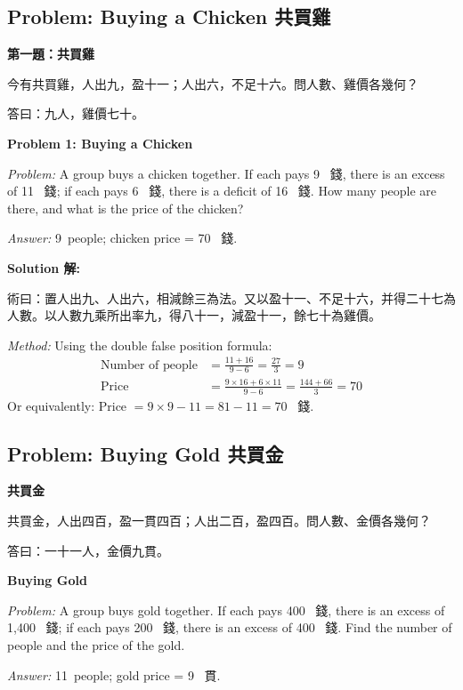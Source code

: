 \documentclass[11pt,a4paper]{article}
\newcommand{\zh}[1]{{\CJKfamily{\CJKrmdefault} #1}}
\newenvironment{chside}{%
  \begin{minipage}[t]{0.48\textwidth}%
  \setlength{\parindent}{1.5em}%
  \linespread{1.25}\selectfont%
  \small%
}{%
  \end{minipage}%
}
\newenvironment{enside}{%
  \hfill\begin{minipage}[t]{0.48\textwidth}%
  \setlength{\parindent}{1em}%
  \linespread{1.15}\selectfont%
  \small%
}{%
  \end{minipage}%
}
\newenvironment{solution}{%
  \par\medskip\noindent\textbf{\textcolor{notecolor}{Solution \zh{解}:}}\par\nopagebreak
  \small\setlength{\parindent}{1em}%
}{%
  \par\medskip%
}
\begin{document}
\subsection{Problem: Buying a Chicken \zh{共買雞}}

\noindent\begin{chside}
\noindent\textbf{第一題：共買雞}

\zh{今有共買雞，人出九，盈十一；人出六，不足十六。問人數、雞價各幾何？}

\medskip
\zh{答曰：九人，雞價七十。}
\end{chside}%
\begin{enside}
\noindent\textbf{Problem 1: Buying a Chicken}

\textit{Problem:} A group buys a chicken together. If each pays 9~\zh{錢},
there is an excess of 11~\zh{錢}; if each pays 6~\zh{錢}, there is a deficit
of 16~\zh{錢}. How many people are there, and what is the price of the
chicken?

\medskip
\textit{Answer:} 9~people; chicken price = 70~\zh{錢}.
\end{enside}

\begin{solution}
\noindent\begin{chside}
\zh{術曰：置人出九、人出六，相減餘三為法。又以盈十一、不足十六，并得二十七為人數。以人數九乘所出率九，得八十一，減盈十一，餘七十為雞價。}
\end{chside}%
\begin{enside}
\textit{Method:} Using the double false position formula:
\begin{align*}
\text{Number of people} &= \frac{11 + 16}{9 - 6} = \frac{27}{3} = 9 \\
\text{Price} &= \frac{9 \times 16 + 6 \times 11}{9 - 6} = \frac{144 + 66}{3} = 70
\end{align*}
Or equivalently: Price $= 9 \times 9 - 11 = 81 - 11 = 70$~\zh{錢}.
\end{enside}
\end{solution}

\subsection{Problem: Buying Gold \zh{共買金}}

\noindent\begin{chside}
\noindent\textbf{共買金}

\zh{共買金，人出四百，盈一貫四百；人出二百，盈四百。問人數、金價各幾何？}

\medskip
\zh{答曰：一十一人，金價九貫。}
\end{chside}%
\begin{enside}
\noindent\textbf{Buying Gold}

\textit{Problem:} A group buys gold together. If each pays 400~\zh{錢},
there is an excess of 1,400~\zh{錢}; if each pays 200~\zh{錢}, there is an
excess of 400~\zh{錢}. Find the number of people and the price of the gold.

\medskip
\textit{Answer:} 11~people; gold price = 9~\zh{貫}.
\end{enside}
\end{document}
